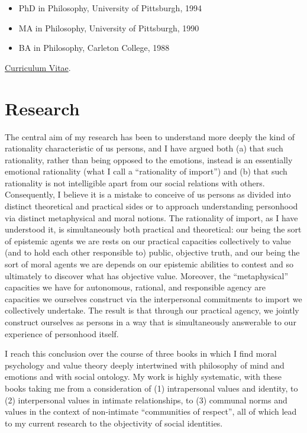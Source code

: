 \documentclass[%
  11pt,%
]{article}
\begin{document}
\begin{itemize}
  \item PhD in Philosophy, University of Pittsburgh, 1994
  \item MA in Philosophy, University of Pittsburgh, 1990
  \item BA in Philosophy, Carleton College, 1988
\end{itemize}

\noindent\href{https://drive.google.com/file/d/1-8fjo2F9EzgfDyYo_WSTYhaU-xrDNU8P/view}{Curriculum Vitae}.

\section{Research}

The central aim of my research has been to understand more deeply the kind of rationality characteristic of us persons, and I have argued both (a) that such rationality, rather than being opposed to the emotions, instead is an essentially emotional rationality (what I call a \enquote{rationality of import}) and (b) that such rationality is not intelligible apart from our social relations with others. Consequently, I believe it is a mistake to conceive of us persons as divided into distinct theoretical and practical sides or to approach understanding personhood via distinct metaphysical and moral notions. The rationality of import, as I have understood it, is simultaneously both practical and theoretical: our being the sort of epistemic agents we are rests on our practical capacities collectively to value (and to hold each other responsible to) public, objective truth, and our being the sort of moral agents we are depends on our epistemic abilities to contest and so ultimately to discover what has objective value. Moreover, the \enquote{metaphysical} capacities we have for autonomous, rational, and responsible agency are capacities we ourselves construct via the interpersonal commitments to import we collectively undertake. The result is that through our practical agency, we jointly construct ourselves as persons in a way that is simultaneously answerable to our experience of personhood itself.

I reach this conclusion over the course of three books in which I find moral psychology and value theory deeply intertwined with philosophy of mind and emotions and with social ontology. My work is highly systematic, with these books taking me from a consideration of (1) intrapersonal values and identity, to (2) interpersonal values in intimate relationships, to (3) communal norms and values in the context of non-intimate \enquote{communities of respect}, all of which lead to my current research to the objectivity of social identities.
\end{document}
